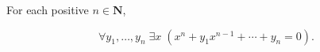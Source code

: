 For each positive $n \in \mathbf{N}$,

$$\forall y_1, \ldots, y_n \; \exists x \; (x^n + y_1 x^{n-1} + \cdots + y_n = 0).$$
